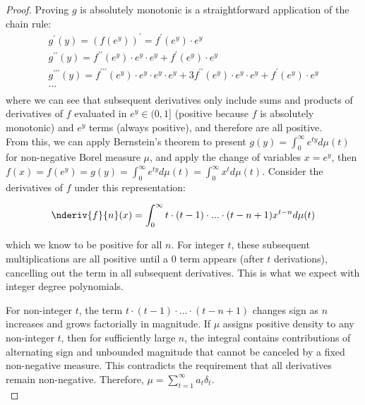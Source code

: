 \documentclass[12pt,a4paper]{article}
\begin{document}
\begin{proof}
Proving $g$ is absolutely monotonic is a straightforward application of the chain rule:
\begin{equation}
\begin{array}{l}
g^{\prime}(y) = (f(e^y))^{\prime} = f^{\prime}(e^y) \cdot e^y\\
g^{\prime\prime}(y) = f^{\prime\prime}(e^y) \cdot e^y \cdot e^y + f^{\prime}(e^y) \cdot e^y\\
g^{\prime\prime\prime}(y) = f^{\prime\prime\prime}(e^y) \cdot e^y \cdot e^y \cdot e^y + 3 f^{\prime\prime}(e^y) \cdot e^y \cdot e^y + f^{\prime}(e^y) \cdot e^y\\
...\\
\end{array}
\end{equation}
\noindent where we can see that subsequent derivatives only include sums and products of derivatives of $f$ evaluated in $e^y \in (0,1]$ (positive because $f$ is absolutely monotonic) and $e^y$ terms (always positive), and therefore are all positive.\\

From this, we can apply Bernstein's theorem to present $g(y) = \int_0^{\infty} e^{ty}d\mu(t)$ for non-negative Borel measure $\mu$, and apply the change of variables $x = e^y$, then $f(x) = f(e^y) = g(y) = \int_0^{\infty} e^{ty}d\mu(t) = \int_0^{\infty} x^t d\mu(t)$. Consider the derivatives of $f$ under this representation:

\begin{equation}
\nderiv{f}{n}(x) = \int_0^{\infty} t \cdot (t-1) \cdot ... \cdot (t - n + 1) x^{t-n} d\mu(t)
\end{equation}

\noindent which we know to be positive for all $n$. For integer $t$, these subsequent multiplications are all positive until a $0$ term appears (after $t$ derivations), cancelling out the term in all subsequent derivatives. This is what we expect with integer degree polynomials.

For non-integer $t$, the term $t \cdot (t−1) \cdot ... \cdot (t−n+1)$ changes sign as $n$ increases and grows factorially in magnitude. If $\mu$ assigns positive density to any non-integer $t$, then for sufficiently large $n$, the integral contains contributions of alternating sign and unbounded magnitude that cannot be canceled by a fixed non-negative measure. This contradicts the requirement that all derivatives remain non-negative. Therefore, $\mu = \sum_{t=1}^{\infty} a_t \delta_t$.\\


\end{proof}
\end{document}
